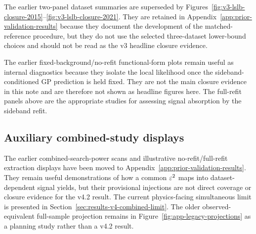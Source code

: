 The earlier two-panel dataset summaries are superseded by
Figures~\ref{fig:v3-lslb-closure-2015}--\ref{fig:v3-lslb-closure-2021}. They are retained
in Appendix~\ref{app:prior-validation-results} because they document the development of
the matched-reference procedure, but they do not use the selected three-dataset lower-bound
choices and should not be read as the v3 headline closure evidence.

\FloatBarrier

The earlier fixed-background/no-refit functional-form plots remain useful as internal
diagnostics because they isolate the local likelihood once the sideband-conditioned GP
prediction is held fixed. They are not the main closure evidence in this note and are
therefore not shown as headline figures here. The full-refit panels above are the
appropriate studies for assessing signal absorption by the sideband refit.

\subsection{Auxiliary combined-study displays}

The earlier combined-search-power scans and illustrative no-refit/full-refit extraction
displays have been moved to Appendix~\ref{app:prior-validation-results}. They remain
useful demonstrations of how a common $\varepsilon^2$ maps into dataset-dependent signal
yields, but their provisional injections are not direct coverage or closure evidence
for the v4.2 result. The current physics-facing simultaneous limit is presented
in Section~\ref{sec:results-v4-combined-limit}. The older observed-equivalent
full-sample projection remains in
Figure~\ref{fig:app-legacy-projections} as a planning study rather than a v4.2 result.
